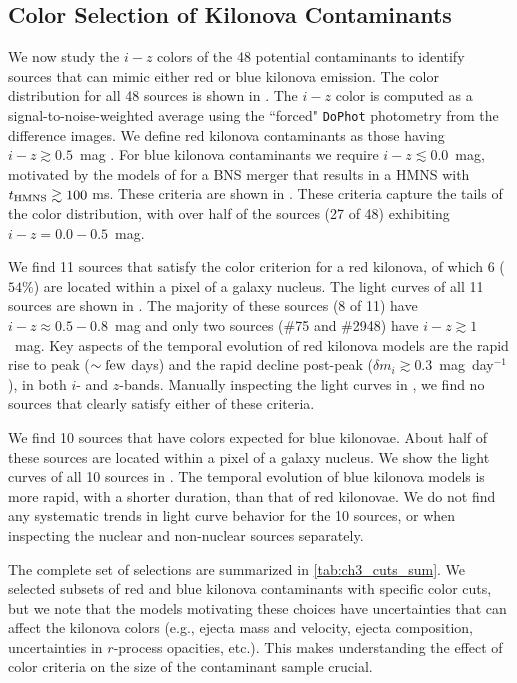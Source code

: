 \subsection{Color Selection of Kilonova Contaminants}
\label{sec:ch3_kn_search}
We now study the $i-z$ colors of the 48 potential contaminants to identify sources that can mimic either red or blue kilonova emission. The color distribution for all 48 sources is shown in . The $i-z$ color is computed as a signal-to-noise-weighted average using the ``forced" {\tt DoPhot} photometry from the difference images. We define red kilonova contaminants as those having $i-z \gtrsim 0.5$~mag \citep{BarnesKasen13,CowpBerger15}. For blue kilonova contaminants we require $i-z \lesssim 0.0$~mag, motivated by the models of \cite{Kasen+15} for a BNS merger that results in a HMNS with $t_{\rm HMNS}\gtrsim 100$ ms. These criteria are shown in . These criteria capture the tails of the color distribution, with over half of the sources (27 of 48) exhibiting $i-z = 0.0-0.5$~mag.

We find 11 sources that satisfy the color criterion for a red kilonova, of which 6 ($54\%$) are located within a pixel of a galaxy nucleus.  The light curves of all 11 sources are shown in . The majority of these sources (8 of 11) have $i-z \approx 0.5-0.8$~mag and only two sources (\#75 and \#2948) have $i-z \gtrsim 1$~mag. Key aspects of the temporal evolution of red kilonova models are the rapid rise to peak ($\sim \rm few$ days) and the rapid decline post-peak ($\delta m_i \gtrsim 0.3$~mag~day$^{-1}$), in both $i$- and $z$-bands. Manually inspecting the light curves in , we find no sources that clearly satisfy either of these criteria.

We find 10 sources that have colors expected for blue kilonovae. About half of these sources are located within a pixel of a galaxy nucleus. We show the light curves of all 10 sources in . The temporal evolution of blue kilonova models is more rapid, with a shorter duration, than that of red kilonovae. We do not find any systematic trends in light curve behavior for the 10 sources, or when inspecting the nuclear and non-nuclear sources separately.

The complete set of selections are summarized in \cref{tab:ch3_cuts_sum}. We selected subsets of red and blue kilonova contaminants with specific color cuts, but we note that the models motivating these choices have uncertainties that can affect the kilonova colors (e.g., ejecta mass and velocity, ejecta composition, uncertainties in $r$-process opacities, etc.). This makes understanding the effect of color criteria on the size of the contaminant sample crucial.

